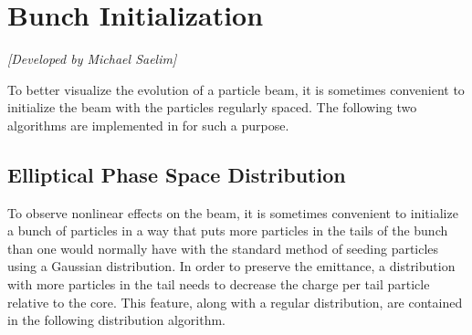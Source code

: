 \section{Bunch Initialization}
\label{s:bunch.init}

\textit{[Developed by Michael Saelim]}

To better visualize the evolution of a particle beam, it is 
sometimes convenient to initialize the beam with
the particles regularly spaced. The following two algorithms
are implemented in \bmad for such a purpose.

\subsection{Elliptical Phase Space Distribution}
\label{ss:ellipse.init}

To observe nonlinear effects on the beam, it is sometimes convenient to
initialize a bunch of particles in a way that puts more particles in the
tails of the bunch than one would normally have with the standard method
of seeding particles using a Gaussian distribution. In order to preserve
the emittance, a distribution with more particles in the tail needs to
decrease the charge per tail particle relative to the core. 
This feature, along with a regular distribution,
are contained in the following 
distribution algorithm. 

